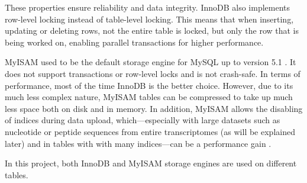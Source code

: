 These properties ensure reliability and data integrity. InnoDB also implements
row-level locking instead of table-level locking. This means that when
inserting, updating or deleting rows, not the entire table is locked, but only
the row that is being worked on, enabling parallel transactions for higher
performance. 

MyISAM used to be the default storage engine for MySQL up to version 5.1
\citep{schwartz2012}. It does not support transactions or row-level locks and is
not crash-safe. In terms of performance, most of the time InnoDB is the better
choice. However, due to its much less complex nature, MyISAM tables can be
compressed to take up much less space both on disk and in memory. In addition,
MyISAM allows the disabling of indices during data upload, which---especially
with large datasets such as nucleotide or peptide sequences from entire
transcriptomes (as will be explained later) and in tables with with many
indices---can be a performance gain \citep{mysql2013}. 

In this project, both InnoDB and MyISAM storage engines are used on different
tables.
